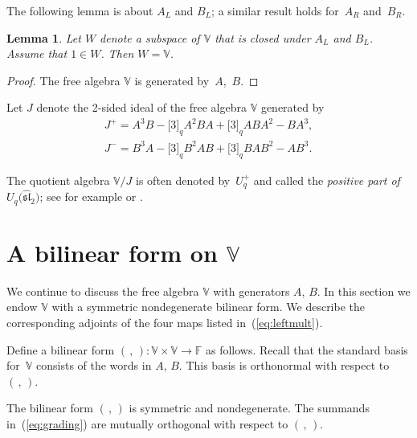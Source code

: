 \documentclass[pdftex]{sigma}
\numberwithin{equation}{section}
\newtheorem{Lemma}[Theorem]{Lemma}
\begin{document}
The following lemma is about $A_L$ and $B_L$; a similar result holds for~$A_R$ and~$B_R$.

\begin{Lemma}\label{lem:WAB} Let $W$ denote a subspace of $\mathbb V$ that is closed
under $A_L$ and $B_L$. Assume that $1 \in W$. Then $W=\mathbb V$.
\end{Lemma}
\begin{proof} The free algebra $\mathbb V$ is generated by~$A$,~$B$.
\end{proof}

\begin{Definition}\label{def:idealJ}Let $J$ denote the 2-sided ideal of the free algebra $\mathbb V$ generated by
\begin{gather}
J^+=A^3 B - \lbrack 3 \rbrack_q A^2 B A+ \lbrack 3 \rbrack_q A B A^2 - B A^3,\label{eq:jplus}\\
J^-= B^3 A - \lbrack 3 \rbrack_q B^2 A B+ \lbrack 3 \rbrack_q B A B^2 - A B^3.\label{eq:jminus}
\end{gather}
\end{Definition}

\begin{Definition}\label{def:pp}The quotient algebra $\mathbb V/J$ is often denoted by~$U^+_q$ and called the {\it positive part of $U_q\big({\widehat{\mathfrak{sl}}}_2\big)$}; see for example
\cite[p.~40]{hongkang} or \cite[Corollary~3.2.6]{lusztig}.
\end{Definition}

\section[A bilinear form on $\mathbb V$]{A bilinear form on $\boldsymbol{\mathbb V}$}\label{section4}

We continue to discuss the free algebra $\mathbb V$ with generators $A$, $B$. In this section we endow $\mathbb V$ with a symmetric nondegenerate bilinear form. We describe the
corresponding adjoints of the four maps listed in~(\ref{eq:leftmult}).

\begin{Definition}\label{def:bilf}\rm Define a bilinear form $(\, ,\,)\colon \mathbb V\times \mathbb V \to
\mathbb F$ as follows. Recall that the standard basis for~$\mathbb V$
consists of the words in $A$, $B$. This basis is orthonormal with respect to $(\,,\,)$.
\end{Definition}

The bilinear form $(\,,\,)$ is symmetric and nondegenerate. The summands in~(\ref{eq:grading}) are mutually orthogonal with respect to $(\,,\,)$.
\end{document}
